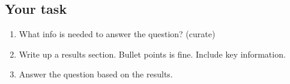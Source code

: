 \documentclass[
  letterpaper,
  DIV=11,
  numbers=noendperiod]{scrartcl}
\providecommand{\tightlist}{%
  \setlength{\itemsep}{0pt}\setlength{\parskip}{0pt}}
\begin{document}
\subsection{Your task}\label{your-task}

\begin{enumerate}
\def\labelenumi{\arabic{enumi}.}
\tightlist
\item
  What info is needed to answer the question? (curate)
\item
  Write up a results section. Bullet points is fine. Include key
  information.
\item
  Answer the question based on the results.
\end{enumerate}
\end{document}
